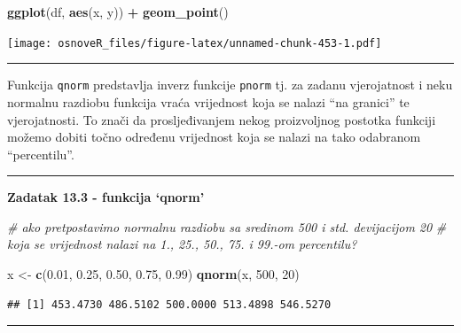 \documentclass[]{book}
\newenvironment{Shaded}{\begin{snugshade}}{\end{snugshade}}
\newcommand{\KeywordTok}[1]{\textcolor[rgb]{0.13,0.29,0.53}{\textbf{#1}}}
\newcommand{\DecValTok}[1]{\textcolor[rgb]{0.00,0.00,0.81}{#1}}
\newcommand{\FloatTok}[1]{\textcolor[rgb]{0.00,0.00,0.81}{#1}}
\newcommand{\StringTok}[1]{\textcolor[rgb]{0.31,0.60,0.02}{#1}}
\newcommand{\CommentTok}[1]{\textcolor[rgb]{0.56,0.35,0.01}{\textit{#1}}}
\newcommand{\OperatorTok}[1]{\textcolor[rgb]{0.81,0.36,0.00}{\textbf{#1}}}
\newcommand{\NormalTok}[1]{#1}
\theoremstyle{definition}
\theoremstyle{definition}
\theoremstyle{definition}
\theoremstyle{remark}
\begin{document}
\begin{Shaded}
\begin{Highlighting}[]
\KeywordTok{ggplot}\NormalTok{(df, }\KeywordTok{aes}\NormalTok{(x, y)) }\OperatorTok{+}\StringTok{ }\KeywordTok{geom_point}\NormalTok{()}
\end{Highlighting}
\end{Shaded}

\texttt{[image: osnoveR\_files/figure-latex/unnamed-chunk-453-1.pdf]}

\begin{center}\rule{0.5\linewidth}{\linethickness}\end{center}

Funkcija \texttt{qnorm} predstavlja inverz funkcije \texttt{pnorm} tj.
za zadanu vjerojatnost i neku normalnu razdiobu funkcija vraća
vrijednost koja se nalazi ``na granici'' te vjerojatnosti. To znači da
prosljeđivanjem nekog proizvoljnog postotka funkciji možemo dobiti točno
određenu vrijednost koja se nalazi na tako odabranom ``percentilu''.

\begin{center}\rule{0.5\linewidth}{\linethickness}\end{center}

\textbf{Zadatak 13.3 - funkcija `qnorm'}

\begin{Shaded}
\begin{Highlighting}[]
\CommentTok{# ako pretpostavimo normalnu razdiobu sa sredinom 500 i std. devijacijom 20}
\CommentTok{# koja se vrijednost nalazi na 1., 25., 50., 75. i 99.-om percentilu?}
\end{Highlighting}
\end{Shaded}

\begin{Shaded}
\begin{Highlighting}[]
\NormalTok{x <-}\StringTok{ }\KeywordTok{c}\NormalTok{(}\FloatTok{0.01}\NormalTok{, }\FloatTok{0.25}\NormalTok{, }\FloatTok{0.50}\NormalTok{, }\FloatTok{0.75}\NormalTok{, }\FloatTok{0.99}\NormalTok{)}
\KeywordTok{qnorm}\NormalTok{(x, }\DecValTok{500}\NormalTok{, }\DecValTok{20}\NormalTok{)}
\end{Highlighting}
\end{Shaded}

\begin{verbatim}
## [1] 453.4730 486.5102 500.0000 513.4898 546.5270
\end{verbatim}

\begin{center}\rule{0.5\linewidth}{\linethickness}\end{center}
\end{document}
